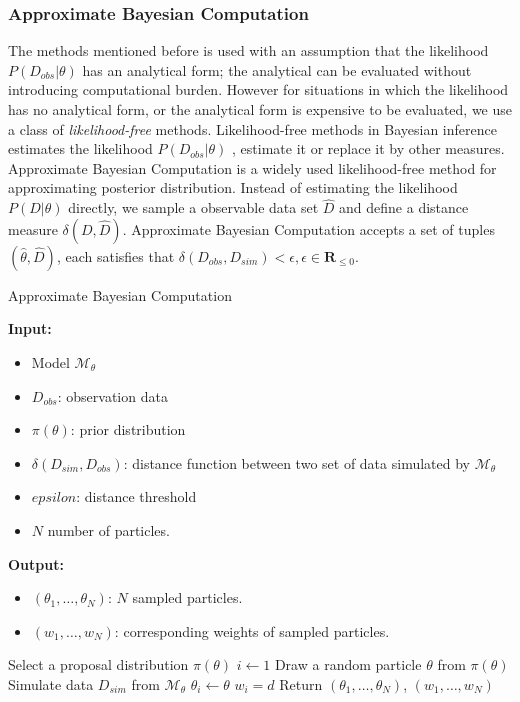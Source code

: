 \subsubsection{Approximate Bayesian Computation}
The methods mentioned before is used with an assumption that the likelihood $P(D_{obs}|\theta)$ has
an analytical form; the analytical can be evaluated without introducing computational burden.
However for situations in which the likelihood has no analytical form, or the analytical form is
expensive to be evaluated, we use a class of \textit{likelihood-free} methods. Likelihood-free
methods in Bayesian inference estimates the likelihood $P(D_{obs}|\theta)$ ,
estimate it or replace it by other measures. Approximate Bayesian Computation is a widely used
likelihood-free method for approximating posterior distribution. Instead of estimating the
likelihood $P(D|\theta)$ directly, we sample a observable data set $\hat{D}$ and define a distance
measure $\delta(D, \hat{D})$. Approximate Bayesian Computation accepts a set of tuples
$(\hat{\theta}, \hat{D})$, each satisfies that $\delta(D_{obs},D_{sim}) < \epsilon,
    \epsilon\in\mathbf{R}_{\leq 0}$.
\begin{algorithm}[H]
    \caption{Approximate Bayesian Computation}
    \label{alg:abc-reject}
    \hspace*{\algorithmicindent} \textbf{Input:}
    \begin{itemize}
        \item Model $\mathcal{M}_\theta$
        \item $D_{obs}$: observation data
        \item $\pi(\theta)$: prior distribution
        \item $\delta(D_{sim}, D_{obs})$: distance function between two set of data simulated by $\mathcal{M}_\theta$
        \item $epsilon$: distance threshold
        \item $N$ number of particles.
    \end{itemize}
    \hspace*{\algorithmicindent} \textbf{Output:}
    \begin{itemize}
        \item $(\theta_1,\ldots,\theta_N)$: $N$ sampled particles.
        \item $(w_1,\ldots,w_N)$: corresponding weights of sampled particles.
    \end{itemize}
    \begin{algorithmic}[1]
        \State Select a proposal distribution $\pi(\theta)$
        \State $i \leftarrow 1$
        \State Draw a random particle $\theta$ from $\pi(\theta)$
        \State Simulate data $D_{sim}$ from $\mathcal{M}_\theta$
        \State $\theta_i \leftarrow \theta$
        \State $w_i = d$
        \EndIf
        \EndWhile
        \State Return $(\theta_1,\ldots,\theta_N)$, $(w_1,\ldots,w_N)$
        \EndProcedure
    \end{algorithmic}
\end{algorithm}
